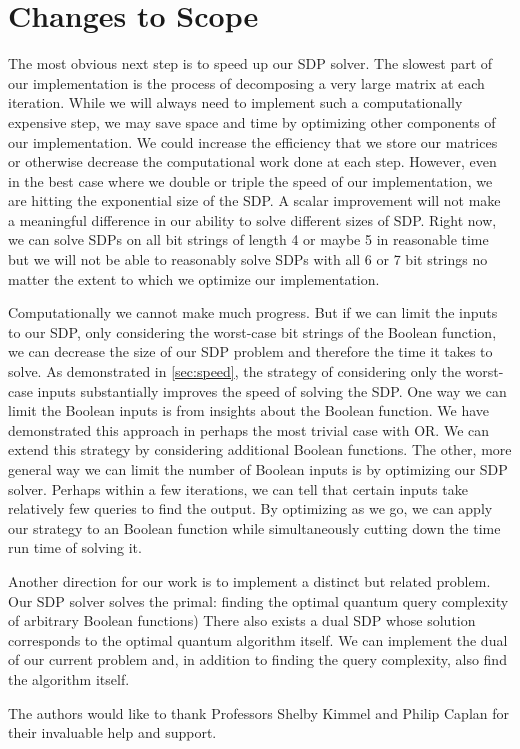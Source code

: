 \section{Changes to Scope}

The most obvious next step is to
speed up our SDP solver.
The slowest part of our implementation is the
process of decomposing a very large matrix at
each iteration.
While we will always need to implement
such a computationally expensive step,
we may save space and time by optimizing other 
components of our implementation.
We could increase the efficiency that
we store our matrices or otherwise 
decrease the computational work done at each step.
However, even in the best case where
we double or triple the speed of our implementation,
we are hitting the exponential size of the SDP.
A scalar improvement will not make a meaningful
difference in our ability to solve different sizes
of SDP.
Right now, we can solve SDPs on all bit strings
of length 4 or maybe 5 in reasonable time
but we will not be able to reasonably solve
SDPs with all 6 or 7 bit strings no matter the extent
to which we optimize our implementation.

Computationally we cannot make much progress.
But if we can limit the inputs to our SDP,
only considering the worst-case bit strings
of the Boolean function,
we can decrease the size of our SDP problem
and therefore the time it takes to solve.
As demonstrated in \cref{sec:speed}, 
the strategy of considering only the worst-case
inputs substantially improves the speed of solving the SDP.
One way we can limit the Boolean inputs is from
insights about the Boolean function.
We have demonstrated this approach in perhaps the most
trivial case with OR.
We can extend this strategy by considering additional
Boolean functions.
The other, more general way we can limit the number
of Boolean inputs is by optimizing our SDP solver.
Perhaps within a few iterations, we can tell
that certain inputs take relatively few queries to find
the output.
By optimizing as we go, we can apply our strategy to
an Boolean function while simultaneously cutting down
the time run time of solving it.

Another direction for our work is to implement
a distinct but related problem.
Our SDP solver solves the primal:
finding the optimal quantum query complexity
of arbitrary Boolean functions)
There also exists a dual SDP whose solution 
corresponds to the optimal quantum algorithm itself.
We can implement the dual of our current problem
and, in addition to finding the query complexity,
also find the algorithm itself.



\begin{acks}
The authors would like to thank Professors Shelby Kimmel
and Philip Caplan for their invaluable help and support. 
\end{acks}